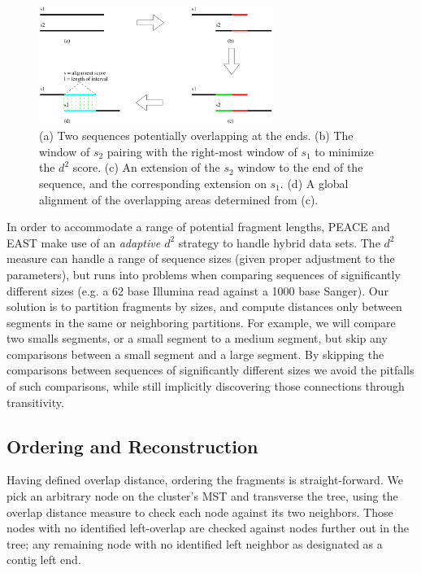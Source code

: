 \documentclass{bioinfo}
\newcommand{\peace} {{\small PEACE}}
\newcommand{\east} {{\small EAST}}
\begin{document}
\begin{figure}
\centerline{\includegraphics[width=3in]{pics.d/overlap_alignment.pdf}}
\caption{(a) Two sequences potentially overlapping at the ends.  (b)
  The window of $s_2$ pairing with the right-most window of $s_1$ to
  minimize the $d^2$ score.  (c) An extension of the $s_2$ window to
  the end of the sequence, and the corresponding extension on $s_1$.
  (d) A global alignment of the overlapping areas determined from
  (c).}\label{fig:overlap}
\end{figure}


In order to accommodate a range of potential fragment lengths,
\peace\/ and \east\/ make use of an {\it adaptive $d^2$} strategy to
handle hybrid data sets.  The $d^2$ measure can handle a range of
sequence sizes (given proper adjustment to the parameters), but runs
into problems when comparing sequences of significantly different
sizes (e.g. a 62 base Illumina read against a 1000 base Sanger).  Our
solution is to partition fragments by sizes, and compute distances
only between segments in the same or neighboring partitions.  For
example, we will compare two smalls segments, or a small segment to a
medium segment, but skip any comparisons between a small segment and a
large segment.  By skipping the comparisons between sequences of
significantly different sizes we avoid the pitfalls of such
comparisons, while still implicitly discovering those connections
through transitivity.

\subsection*{Ordering and Reconstruction}

Having defined overlap distance, ordering the fragments is
straight-forward.  We pick an arbitrary node on the cluster's MST and
transverse the tree, using the overlap distance measure to check each
node against its two neighbors.  Those nodes with no identified
left-overlap are checked against nodes further out in the tree; any
remaining node with no identified left neighbor as designated as
a contig left end.
\end{document}

